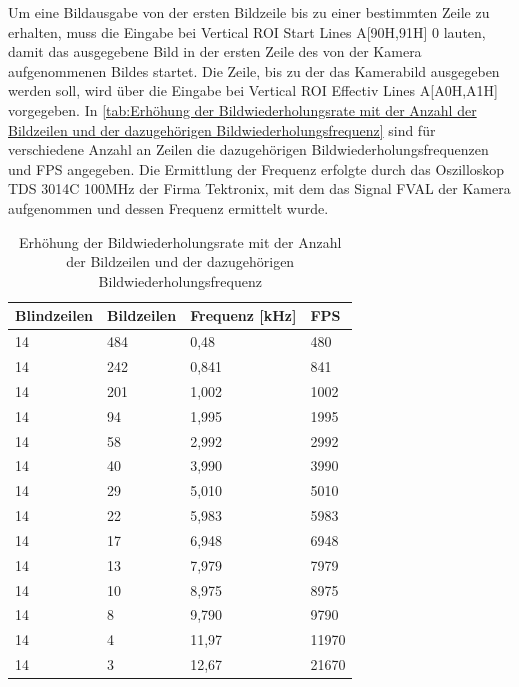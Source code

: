 \documentclass[ngerman,12pt]{article} %
\begin{document}
{Um eine Bildausgabe von der ersten Bildzeile bis zu einer bestimmten Zeile zu erhalten, muss die Eingabe bei Vertical ROI Start Lines A[90H,91H] 0 lauten, damit das ausgegebene Bild in der ersten Zeile des von der Kamera aufgenommenen Bildes startet. Die Zeile, bis zu der das Kamerabild ausgegeben werden soll, wird über die Eingabe bei Vertical ROI Effectiv Lines A[A0H,A1H] vorgegeben. In \autoref{tab:Erhöhung der Bildwiederholungsrate mit der Anzahl der Bildzeilen und der dazugehörigen Bildwiederholungsfrequenz} sind für verschiedene Anzahl an Zeilen die dazugehörigen Bildwiederholungsfrequenzen und FPS angegeben. Die Ermittlung der Frequenz erfolgte durch das Oszilloskop TDS 3014C 100MHz der Firma Tektronix, mit dem das Signal FVAL der Kamera aufgenommen und dessen Frequenz ermittelt wurde.\\

\begin{table}[h!tb]
\begin{center}
\caption[Erhöhung der Bildwiederholungsrate mit der Anzahl der Bildzeilen und der dazugehörigen Bildwiederholungsfrequenz]{\label{tab:Erhöhung der Bildwiederholungsrate mit der Anzahl der Bildzeilen und der dazugehörigen Bildwiederholungsfrequenz}Erhöhung der Bildwiederholungsrate mit der Anzahl der Bildzeilen und der dazugehörigen Bildwiederholungsfrequenz}
\begin{tabularx}{0.6\textwidth}{|X|X|X|X|}
\hline
Blindzeilen & Bildzeilen &Frequenz [kHz] & FPS\\
\hline
14	& 484			& 0,48	& 480\\
\hline
14	& 242			& 0,841	& 841\\
\hline
14	& 201			& 1,002	& 1002\\
\hline
14	& 94			& 1,995	& 1995\\
\hline
14	& 58			& 2,992	& 2992\\
\hline
14	& 40			& 3,990	& 3990\\
\hline
14	& 29			& 5,010	& 5010\\
\hline
14	& 22			& 5,983	& 5983\\
\hline
14	& 17			& 6,948	& 6948\\
\hline
14	& 13			& 7,979	& 7979\\
\hline
14	& 10			& 8,975	& 8975\\
\hline
14	& 8			& 9,790	& 9790\\
\hline
14	& 4			& 11,97	& 11970\\
\hline
14	& 3			& 12,67	& 21670\\
\hline
\end{tabularx}
\end{center}
\end{table}

}
\end{document}
